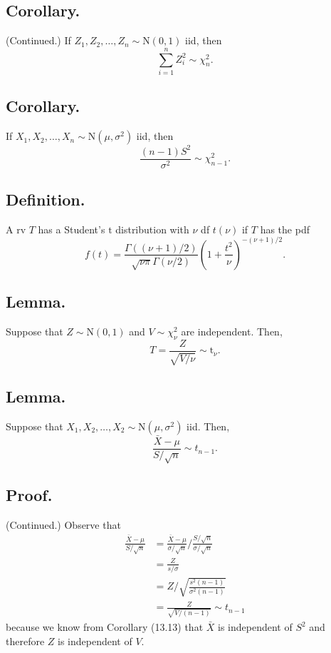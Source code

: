 \documentclass[titlepage]{article}
\begin{document}
\subsection{Corollary.} (Continued.) If $Z_{1}, Z_{2}, \ldots, Z_{n} \sim \text{N}(0, 1)$ iid, then 
$$\sum_{i=1}^{n}Z_{i}^{2} \sim \chi_{n}^{2}.$$

\subsection{Corollary.} If $X_{1}, X_{2}, \ldots, X_{n} \sim \text{N}(\mu, \sigma^{2})$ iid, then
$$\frac{(n-1)S^{2}}{\sigma^{2}} \sim \chi_{n-1}^{2}.$$

\subsection{Definition.} A rv $T$ has a Student's $\text{t}$ distribution with $\nu$ df $t(\nu)$ if $T$ has the pdf
$$f(t) = \frac{\Gamma((\nu+1)/2)}{\sqrt{\nu\pi}\Gamma(\nu/2)}\left(1 + \frac{t^{2}}{\nu}\right)^{-(\nu+1)/2}.$$

\subsection{Lemma.} Suppose that $Z \sim \text{N}(0, 1)$ and $V \sim \chi_{\nu}^{2}$ are independent. Then, 
$$T = \frac{Z}{\sqrt{V/\nu}} \sim \text{t}_{\nu}.$$

\subsection{Lemma.} Suppose that $X_{1}, X_{2}, \ldots, X_{2} \sim \text{N}(\mu, \sigma^{2})$ iid. Then, 
$$\frac{\bar{X} - \mu}{S/\sqrt{n}} \sim t_{n-1}.$$

\subsection{Proof.} (Continued.) Observe that 
\begin{align*}
    \frac{\bar{X}-\mu}{S/\sqrt{n}} &= \frac{\bar{X}-\mu}{\sigma/\sqrt{n}}/\frac{S/\sqrt{n}}{\sigma/\sqrt{n}} \\
                                   &= \frac{Z}{s/\sigma} \\
                                   &= Z/\sqrt{\frac{s^{2}(n-1)}{\sigma^{2}(n-1)}} \\
                                   &= \frac{Z}{\sqrt{V/(n-1)}} \sim t_{n-1}
\end{align*}
because we know from Corollary (13.13) that $\bar{X}$ is independent of $S^{2}$ and therefore $Z$ is independent of $V$.
\end{document}
